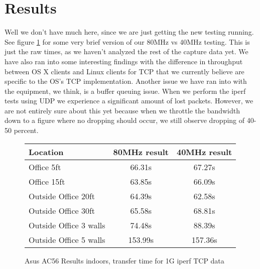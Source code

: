 \section{Results}
Well we don't have much here, since we are just getting the new testing running.
\\
See figure \ref{fig} for some very brief version of our 80MHz vs
40MHz testing. This is just the raw times, as we haven't analyzed the
rest of the capture data yet. We have also ran into some interesting findings
with the difference in throughput between OS X clients and Linux clients for TCP
that we currently believe are specific to the OS's TCP implementation. Another issue
we have ran into with the equipment, we think, is a buffer queuing issue. When we
perform the iperf tests using UDP we experience a significant amount of lost packets.
However, we are not entirely sure about this yet because when we throttle the bandwidth down
to a figure where no dropping should occur, we still observe dropping of 40-50 percent.

\begin{figure}[h!]
\begin{tabular}{| l || c | c |}
\hline
Location & 80MHz result & 40MHz result \\\hline
Office 5ft & 66.31s & 67.27s \\\hline
Office 15ft & 63.85s & 66.09s \\\hline
Outside Office 20ft & 64.39s & 62.58s \\\hline
Outside Office 30ft & 65.58s & 68.81s \\\hline
Outside Office 3 walls & 74.48s & 88.39s \\\hline
Outside Office 5 walls & 153.99s & 157.36s \\ \hline
\end{tabular}
\caption{Asus AC56 Results indoors, transfer time for 1G iperf TCP data}
\label{fig}
\end{figure}
\pagebreak
